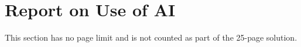 %
%
\section{Report on Use of AI}
\label{sec:ai}

This section has no page limit and is not counted as part of the 25-page solution.

\setlength{\emergencystretch}{2em}

